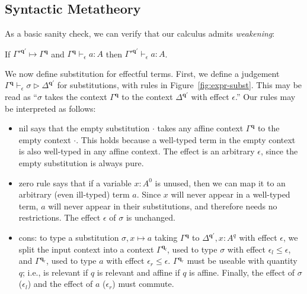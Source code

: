 \documentclass[acmsmall,screen,anonymous,review]{acmart}
\newcommand{\mb}[1]{\ensuremath{\mathbf{#1}}}
\newcommand{\cwk}[2]{#1 \mapsto #2}
\newcommand{\rle}[1]{{\scriptsize\textsf{#1}}}
\newcommand{\hasty}[4]{#1 \vdash_{#2} #3: {#4}}
\newcommand{\issubst}[4]{#1 \vdash_{#2} #3 \rhd #4}
\newcommand{\brle}[1]{{\textsf{#1}}}
\begin{document}
\subsection{Syntactic Metatheory}

As a basic sanity check, we can verify that our calculus admits \emph{weakening}:
\begin{lemma}[name=Weakening, restate=synmonwk]
  If ${\cwk{\Gamma'^{\mb{q}'}}{\Gamma^{\mb{q}}}}$ and ${\hasty{\Gamma^{\mb{q}}}{\epsilon}{a}{A}}$ then
  ${\hasty{\Gamma'^{\mb{q}'}}{\epsilon}{a}{A}}$. 
\end{lemma}

We now define substitution for effectful terms. First, we define a judgement $\issubst{\Gamma^{\mb{q}}}{\epsilon}{\sigma}{\Delta^{\mb{q}'}}$
for substitutions, with rules in Figure~\ref{fig:expr-subst}. This may be read as ``$\sigma$ takes the
context $\Gamma^{\mb{q}}$ to the context $\Delta^{\mb{q}'}$ with effect $\epsilon$.'' Our rules may
be interpreted as follows:
\begin{itemize}
  \item \brle{nil} says that the empty substitution $\cdot$ takes any affine context
  $\Gamma^{\mb{q}}$ to the empty context $\cdot$. This holds because a
  well-typed term in the empty context is also well-typed in any affine context. The effect is an
  arbitrary $\epsilon$, since the empty substitution is always pure.
  \item  \brle{zero} rule says that if a variable $x : A^0$ is
  unused, then we can map it to an arbitrary (even ill-typed) term $a$. Since $x$ will 
  never appear in a well-typed term, $a$ will never appear in their
  substitutions, and therefore needs no restrictions. The effect $\epsilon$ of
  $\sigma$ is unchanged.
  \item \brle{cons}: to type a substitution $\sigma, x \mapsto a$ taking  $\Gamma^{\mb{q}}$ to
  $\Delta^{\mb{q}'}, x: A^q$ with effect $\epsilon$, we split the input context into a context
  $\Gamma^{\mb{q}_l}$, used to type $\sigma$ with effect $\epsilon_l \leq \epsilon$, and
  $\Gamma^{\mb{q}_r}$, used to type $a$ with effect $\epsilon_r \leq \epsilon$.  $\Gamma^{\mb{q}_r}$
  must be useable with quantity $q$; i.e., is relevant if $q$ is
  relevant and affine if $q$ is affine. Finally, the effect of $\sigma$
  ($\epsilon_l$) and the effect of $a$ ($\epsilon_r$) must commute.
\end{itemize}
\end{document}

